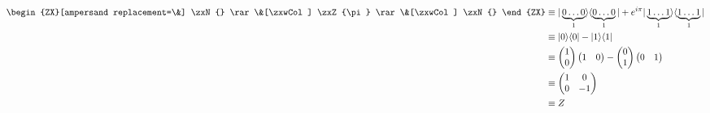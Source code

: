 \documentclass[conference]{IEEEtran}
\begin{document}
\begin{align}
    \begin{ZX}[ampersand replacement=\&]
        \zxN{} \rar \&[\zxwCol] \zxZ{\pi} \rar \&[\zxwCol] \zxN{}
    \end{ZX}
     & \equiv |\underbrace{0\dots 0}_{1}\rangle \langle \underbrace{0\dots0}_{1}| + e^{i\pi}|\underbrace{1\dots1}_{1}\rangle \langle \underbrace{1\dots1}_{1}| \\
     & \equiv
    |0\rangle \langle 0| - |1\rangle \langle 1|                                                                                                                \\
     & \equiv
    \begin{pmatrix}
        1 \\
        0 \\
    \end{pmatrix}
    \begin{pmatrix}
        1 & 0 \\
    \end{pmatrix}
    - \begin{pmatrix}
          0 \\
          1 \\
      \end{pmatrix}
    \begin{pmatrix}
        0 & 1 \\
    \end{pmatrix}                                                                                                                                             \\
     & \equiv
    \begin{pmatrix}
        1 & 0  \\
        0 & -1 \\
    \end{pmatrix}                                                                                                                                             \\
     & \equiv Z
\end{align}
\end{document}
